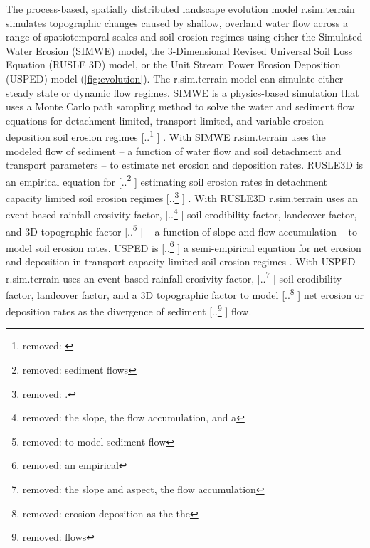 \documentclass[gmd, manuscript]{copernicus}
\providecommand{\DIFadd}[1]{{\protect\color{blue} \sf #1}} %
\providecommand{\DIFdel}[1]{{\protect\color{red} [..\footnote{removed: #1} ]}} %
\providecommand{\DIFaddbegin}{} %
\providecommand{\DIFaddend}{} %
\providecommand{\DIFdelbegin}{} %
\providecommand{\DIFdelend}{} %
\begin{document}
\DIFaddend The process-based, spatially distributed 
landscape evolution model r.sim.terrain
simulates topographic changes
caused by shallow, overland water flow
across a range of spatiotemporal scales and soil erosion regimes
using either
the Simulated Water Erosion (SIMWE) model, 
the 3-Dimensional Revised Universal Soil Loss Equation (RUSLE 3D) model,
or the Unit Stream Power Erosion Deposition (USPED) model \DIFaddbegin \DIFadd{(\ref {fig:evolution}).  
The r.sim.terrain model
can simulate either steady state or dynamic flow regimes}\DIFaddend .
SIMWE is a physics-based simulation
that uses a Monte Carlo path sampling method
to solve the water and sediment flow equations
for detachment limited, transport limited, and variable erosion-deposition 
soil erosion regimes 
\DIFdelbegin \DIFdel{\citep{Mitasova2004}}\DIFdelend \DIFaddbegin \DIFadd{\citep{Mitas1998,Mitasova2004}}\DIFaddend . 
With SIMWE 
r.sim.terrain
uses the modeled flow of sediment 
-- a function of water flow and soil detachment and transport parameters -- 
to estimate net erosion and deposition rates. 
RUSLE3D is an empirical equation for \DIFdelbegin \DIFdel{sediment flows 
}\DIFdelend \DIFaddbegin \DIFadd{estimating soil erosion rates
}\DIFaddend in detachment capacity limited soil erosion regimes 
\DIFdelbegin \DIFdel{\citep{Mitasova1996}. 
}\DIFdelend \DIFaddbegin \DIFadd{\citep{Mitasova1996,Mitasova2013}. 
}\DIFaddend With RUSLE3D r.sim.terrain
uses an event-based \DIFaddbegin \DIFadd{rainfall }\DIFaddend erosivity factor, 
\DIFdelbegin \DIFdel{the slope, the flow accumulation, and a }\DIFdelend \DIFaddbegin \DIFadd{soil erodibility factor, landcover factor, and }\DIFaddend 3D topographic factor
\DIFdelbegin \DIFdel{to model sediment flow}\DIFdelend \DIFaddbegin \DIFadd{-- a function of slope and flow accumulation --
to model soil erosion rates}\DIFaddend . 
USPED is \DIFdelbegin \DIFdel{an empirical }\DIFdelend \DIFaddbegin \DIFadd{a semi-empirical }\DIFaddend equation for net erosion and deposition 
in transport capacity limited soil erosion regimes 
\DIFaddbegin \DIFadd{\citep{Mitasova1996,Mitasova2013}}\DIFaddend . 
With USPED r.sim.terrain uses an event-based \DIFaddbegin \DIFadd{rainfall }\DIFaddend erosivity factor, 
\DIFdelbegin \DIFdel{the slope and aspect, the flow accumulation}\DIFdelend \DIFaddbegin \DIFadd{soil erodibility factor, landcover factor}\DIFaddend , and a 3D topographic factor
to model \DIFdelbegin \DIFdel{erosion-deposition as the the }\DIFdelend \DIFaddbegin \DIFadd{net erosion or deposition rates as the }\DIFaddend divergence of sediment \DIFdelbegin \DIFdel{flows}\DIFdelend \DIFaddbegin \DIFadd{flow}\DIFaddend . 
\end{document}
